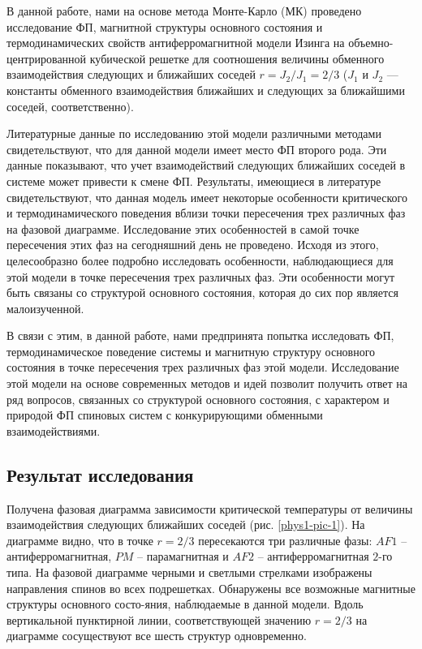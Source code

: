 В данной работе, нами на основе метода Монте-Карло (МК) проведено исследование ФП, магнитной структуры основного состояния и термодинамических свойств антиферромагнитной модели Изинга на объемно-центрированной кубической решетке для соотношения величины обменного взаимодействия следующих и ближайших соседей $r=J_2/J_1=2/3$ ($J_1$ и $J_2$ --- константы обменного взаимодействия ближайших и следующих за ближайшими соседей, соответственно).

Литературные данные по исследованию этой модели различными методами свидетельствуют, что для данной модели имеет место ФП второго рода. Эти данные показывают, что учет взаимодействий следующих ближайших соседей в системе может привести к смене ФП. Результаты, имеющиеся в литературе свидетельствуют, что данная модель имеет некоторые особенности критического и термодинамического поведения вблизи точки пересечения трех различных фаз на фазовой диаграмме. Исследование этих особенностей в самой точке пересечения этих фаз на сегодняшний день не проведено. Исходя из этого, целесообразно более подробно исследовать особенности, наблюдающиеся для этой модели в точке пересечения трех различных фаз. Эти особенности могут быть связаны со структурой основного состояния, которая до сих пор является малоизученной.

В связи с этим, в данной работе, нами предпринята попытка исследовать ФП, термодинамическое поведение системы и магнитную структуру основного состояния в точке пересечения трех различных фаз этой модели. Исследование этой модели на основе современных методов и идей позволит получить ответ на ряд вопросов, связанных со структурой основного состояния, с характером и природой ФП спиновых систем с конкурирующими обменными взаимодействиями.



\subsection{Результат исследования}



Получена фазовая диаграмма зависимости критической температуры от величины взаимодействия следующих ближайших соседей (рис. \ref{phys1-pic-1}). На диаграмме видно, что в точке $r=2/3$ пересекаются три различные фазы: $AF1$ -- антиферромагнитная, $PM$ -- парамагнитная и $AF2$ -- антиферромагнитная $2$-го типа. На фазовой диаграмме черными и светлыми стрелками изображены направления спинов во всех подрешетках. Обнаружены все возможные магнитные структуры основного состо-яния, наблюдаемые в данной модели. Вдоль вертикальной пунктирной линии, соответствующей значению $r=2/3$ на диаграмме сосуществуют все шесть структур одновременно.

